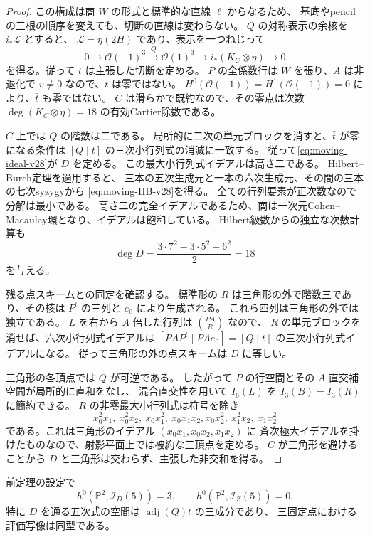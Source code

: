 \begin{proof}
この構成は商 $W$ の形式と標準的な直線 $\ell$ からなるため、
基底やpencilの三根の順序を変えても、切断の直線は変わらない。
$Q$ の対称表示の余核を $i_*\mathcal L$ とすると、
$\mathcal L=\eta(2H)$ であり、表示を一つねじって
\[
 0\longrightarrow\mathcal O(-1)^3
 \xrightarrow{Q}\mathcal O(1)^3
 \longrightarrow i_*(K_C\otimes\eta)\longrightarrow0
\]
を得る。従って $t$ は主張した切断を定める。
$P$ の全係数行は $W$ を張り、$A$ は非退化で $v\ne0$ なので、$t$ は零ではない。
$H^0(\mathcal O(-1))=H^1(\mathcal O(-1))=0$ により、$\bar t$ も零ではない。
$C$ は滑らかで既約なので、その零点は次数
$\deg(K_C\otimes\eta)=18$ の有効Cartier除数である。

$C$ 上では $Q$ の階数は二である。
局所的に二次の単元ブロックを消すと、$\bar t$ が零になる条件は
$[Q\mid t]$ の三次小行列式の消滅に一致する。
従って\eqref{eq:moving-ideal-v28}が $D$ を定める。
この最大小行列式イデアルは高さ二である。
Hilbert--Burch定理\cite[Theorem~2.2]{EisenbudSidman}を適用すると、
三本の五次生成元と一本の六次生成元、その間の三本の七次syzygyから
\eqref{eq:moving-HB-v28}を得る。
全ての行列要素が正次数なので分解は最小である。
高さ二の完全イデアルであるため、商は一次元Cohen--Macaulay環となり、イデアルは飽和している。
Hilbert級数からの独立な次数計算も
\[
 \deg D=\frac{3\cdot7^2-3\cdot5^2-6^2}{2}=18
\]
を与える。

残る点スキームとの同定を確認する。
標準形の $R$ は三角形の外で階数三であり、その核は
$P^t$ の三列と $e_0$ により生成される。
これら四列は三角形の外では独立である。
$L$ を右から $A$ 倍した行列は $\binom{PA}{R}$ なので、
$R$ の単元ブロックを消せば、六次小行列式イデアルは
$[PAP^t\mid PAe_0]=[Q\mid t]$ の三次小行列式イデアルになる。
従って三角形の外の点スキームは $D$ に等しい。

三角形の各頂点では $Q$ が可逆である。
したがって $P$ の行空間とその $A$ 直交補空間が局所的に直和をなし、
混合直交性を用いて $I_6(L)$ を $I_3(B)=I_3(R)$ に簡約できる。
$R$ の非零最大小行列式は符号を除き
\[
 x_0^2x_1,\ x_0^2x_2,\ x_0x_1^2,\ x_0x_1x_2,
 x_0x_2^2,\ x_1^2x_2,\ x_1x_2^2
\]
である。これは三角形のイデアル $(x_0x_1,x_0x_2,x_1x_2)$ に
斉次極大イデアルを掛けたものなので、射影平面上では被約な三頂点を定める。
$C$ が三角形を避けることから $D$ と三角形は交わらず、主張した非交和を得る。
\end{proof}

\begin{corollary}[五次式による十八点と三固定点の分離]
\label{cor:quintic-separation-v28}
前定理の設定で
\[
 h^0(\mathbb P^2,\mathcal I_D(5))=3,\qquad
 h^0(\mathbb P^2,\mathcal I_Z(5))=0.
\]
特に $D$ を通る五次式の空間は $\operatorname{adj}(Q)t$ の三成分であり、
三固定点における評価写像は同型である。
\end{corollary}

